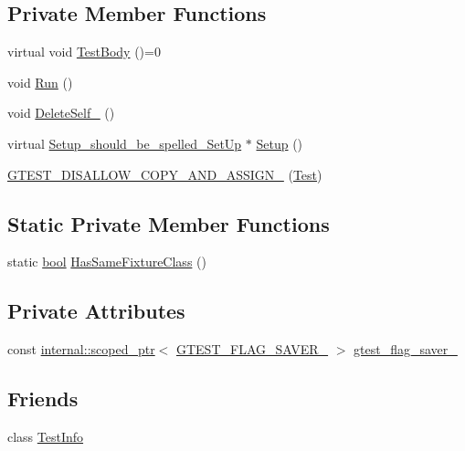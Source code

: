 \subsection*{Private Member Functions}
\begin{DoxyCompactItemize}
\item 
virtual void \hyperlink{classtesting_1_1Test_a146a4a5d9854e676d625a0ef67409794}{Test\+Body} ()=0
\item 
void \hyperlink{classtesting_1_1Test_a939ae280a6f2f1c3d43708ec616684ed}{Run} ()
\item 
void \hyperlink{classtesting_1_1Test_a3116f1f98ac889b11f1e3d981b8c6ca1}{Delete\+Self\+\_\+} ()
\item 
virtual \hyperlink{structtesting_1_1Test_1_1Setup__should__be__spelled__SetUp}{Setup\+\_\+should\+\_\+be\+\_\+spelled\+\_\+\+Set\+Up} $\ast$ \hyperlink{classtesting_1_1Test_a65c1626d50b7dd1a1d759dc6c3f72d4c}{Setup} ()
\item 
\hyperlink{classtesting_1_1Test_a5d18da7437b0d6ca32dcad90a21f9b6b}{G\+T\+E\+S\+T\+\_\+\+D\+I\+S\+A\+L\+L\+O\+W\+\_\+\+C\+O\+P\+Y\+\_\+\+A\+N\+D\+\_\+\+A\+S\+S\+I\+G\+N\+\_\+} (\hyperlink{classtesting_1_1Test}{Test})
\end{DoxyCompactItemize}
\subsection*{Static Private Member Functions}
\begin{DoxyCompactItemize}
\item 
static \hyperlink{classbool}{bool} \hyperlink{classtesting_1_1Test_a5daca5a35e33e8fbdf36b7b666668b34}{Has\+Same\+Fixture\+Class} ()
\end{DoxyCompactItemize}
\subsection*{Private Attributes}
\begin{DoxyCompactItemize}
\item 
const \hyperlink{classtesting_1_1internal_1_1scoped__ptr}{internal\+::scoped\+\_\+ptr}$<$ \hyperlink{gtest-port_8h_a3749ef4fba6b3c3993609b336031644d}{G\+T\+E\+S\+T\+\_\+\+F\+L\+A\+G\+\_\+\+S\+A\+V\+E\+R\+\_\+} $>$ \hyperlink{classtesting_1_1Test_a132c542f6932107234988d05a9980e49}{gtest\+\_\+flag\+\_\+saver\+\_\+}
\end{DoxyCompactItemize}
\subsection*{Friends}
\begin{DoxyCompactItemize}
\item 
class \hyperlink{classtesting_1_1Test_a4c49c2cdb6c328e6b709b4542f23de3c}{Test\+Info}
\end{DoxyCompactItemize}


